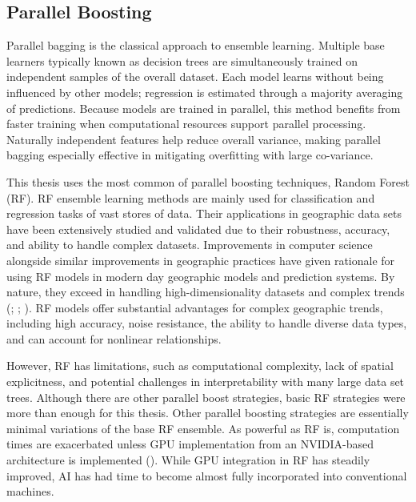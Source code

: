 \subsection{Parallel Boosting} \label{subs:ml2pb} Parallel bagging is the classical approach to ensemble learning. Multiple base learners typically known as decision trees are simultaneously trained on independent samples of the overall dataset. Each model learns without being influenced by other models; regression is estimated through a majority averaging of predictions. Because models are trained in parallel, this method benefits from faster training when computational resources support parallel processing. Naturally independent features help reduce overall variance, making parallel bagging especially effective in mitigating overfitting with large co-variance. 

This thesis uses the most common of parallel boosting techniques, Random Forest (RF). RF ensemble learning methods are mainly used for classification and regression tasks of vast stores of data. Their applications in geographic data sets have been extensively studied and validated due to their robustness, accuracy, and ability to handle complex datasets. Improvements in computer science alongside similar improvements in geographic practices have given rationale for using RF models in modern day geographic models and prediction systems. By nature, they exceed in handling high-dimensionality datasets and complex trends (\cite{wang_high-resolution_2024}; \cite{runmei_ma_full-coverage_2021}; \cite{wright_ranger_2017}). RF models offer substantial advantages for complex geographic trends, including high accuracy, noise resistance, the ability to handle diverse data types, and can account for nonlinear relationships. 

However, RF has limitations, such as computational complexity, lack of spatial explicitness, and potential challenges in interpretability with many large data set trees. Although there are other parallel boost strategies, basic RF strategies were more than enough for this thesis. Other parallel boosting strategies are essentially minimal variations of the base RF ensemble. As powerful as RF is, computation times are exacerbated unless GPU implementation from an NVIDIA-based architecture is implemented (\cite{schulz2015}). While GPU integration in RF has steadily improved, AI has had time to become almost fully incorporated into conventional machines.
